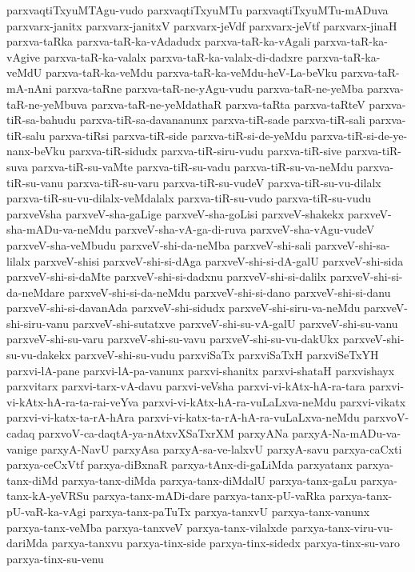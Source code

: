 {parxvaqtiTxyuMTAgu-vudo
parxvaqtiTxyuMTu
parxvaqtiTxyuMTu-mADuva
parxvarx-janitx
parxvarx-janitxV
parxvarx-jeVdf
parxvarx-jeVtf
parxvarx-jinaH
parxva-taRka
parxva-taR-ka-vAdadudx
parxva-taR-ka-vAgali
parxva-taR-ka-vAgive
parxva-taR-ka-valalx
parxva-taR-ka-valalx-di-dadxre
parxva-taR-ka-veMdU
parxva-taR-ka-veMdu
parxva-taR-ka-veMdu-heV-La-beVku
parxva-taR-mA-nAni
parxva-taRne
parxva-taR-ne-yAgu-vudu
parxva-taR-ne-yeMba
parxva-taR-ne-yeMbuva
parxva-taR-ne-yeMdathaR
parxva-taRta
parxva-taRteV
parxva-tiR-sa-bahudu
parxva-tiR-sa-davananunx
parxva-tiR-sade
parxva-tiR-sali
parxva-tiR-salu
parxva-tiRsi
parxva-tiR-side
parxva-tiR-si-de-yeMdu
parxva-tiR-si-de-ye-nanx-beVku
parxva-tiR-sidudx
parxva-tiR-siru-vudu
parxva-tiR-sive
parxva-tiR-suva
parxva-tiR-su-vaMte
parxva-tiR-su-vadu
parxva-tiR-su-va-neMdu
parxva-tiR-su-vanu
parxva-tiR-su-varu
parxva-tiR-su-vudeV
parxva-tiR-su-vu-dilalx
parxva-tiR-su-vu-dilalx-veMdalalx
parxva-tiR-su-vudo
parxva-tiR-su-vudu
parxveVsha
parxveV-sha-gaLige
parxveV-sha-goLisi
parxveV-shakekx
parxveV-sha-mADu-va-neMdu
parxveV-sha-vA-ga-di-ruva
parxveV-sha-vAgu-vudeV
parxveV-sha-veMbudu
parxveV-shi-da-neMba
parxveV-shi-sali
parxveV-shi-sa-lilalx
parxveV-shisi
parxveV-shi-si-dAga
parxveV-shi-si-dA-galU
parxveV-shi-sida
parxveV-shi-si-daMte
parxveV-shi-si-dadxnu
parxveV-shi-si-dalilx
parxveV-shi-si-da-neMdare
parxveV-shi-si-da-neMdu
parxveV-shi-si-dano
parxveV-shi-si-danu
parxveV-shi-si-davanAda
parxveV-shi-sidudx
parxveV-shi-siru-va-neMdu
parxveV-shi-siru-vanu
parxveV-shi-sutatxve
parxveV-shi-su-vA-galU
parxveV-shi-su-vanu
parxveV-shi-su-varu
parxveV-shi-su-vavu
parxveV-shi-su-vu-dakUkx
parxveV-shi-su-vu-dakekx
parxveV-shi-su-vudu
parxviSaTx
parxviSaTxH
parxviSeTxYH
parxvi-lA-pane
parxvi-lA-pa-vanunx
parxvi-shanitx
parxvi-shataH
parxvishayx
parxvitarx
parxvi-tarx-vA-davu
parxvi-veVsha
parxvi-vi-kAtx-hA-ra-tara
parxvi-vi-kAtx-hA-ra-ta-rai-veYva
parxvi-vi-kAtx-hA-ra-vuLaLxva-neMdu
parxvi-vikatx
parxvi-vi-katx-ta-rA-hAra
parxvi-vi-katx-ta-rA-hA-ra-vuLaLxva-neMdu
parxvoV-cadaq
parxvoV-ca-daqtA-ya-nAtxvXSaTxrXM
parxyANa
parxyA-Na-mADu-va-vanige
parxyA-NavU
parxyAsa
parxyA-sa-ve-lalxvU
parxyA-savu
parxya-caCxti
parxya-ceCxVtf
parxya-diBxnaR
parxya-tAnx-di-gaLiMda
parxyatanx
parxya-tanx-diMd
parxya-tanx-diMda
parxya-tanx-diMdalU
parxya-tanx-gaLu
parxya-tanx-kA-yeVRSu
parxya-tanx-mADi-dare
parxya-tanx-pU-vaRka
parxya-tanx-pU-vaR-ka-vAgi
parxya-tanx-paTuTx
parxya-tanxvU
parxya-tanx-vanunx
parxya-tanx-veMba
parxya-tanxveV
parxya-tanx-vilalxde
parxya-tanx-viru-vu-dariMda
parxya-tanxvu
parxya-tinx-side
parxya-tinx-sidedx
parxya-tinx-su-varo
parxya-tinx-su-venu
}

